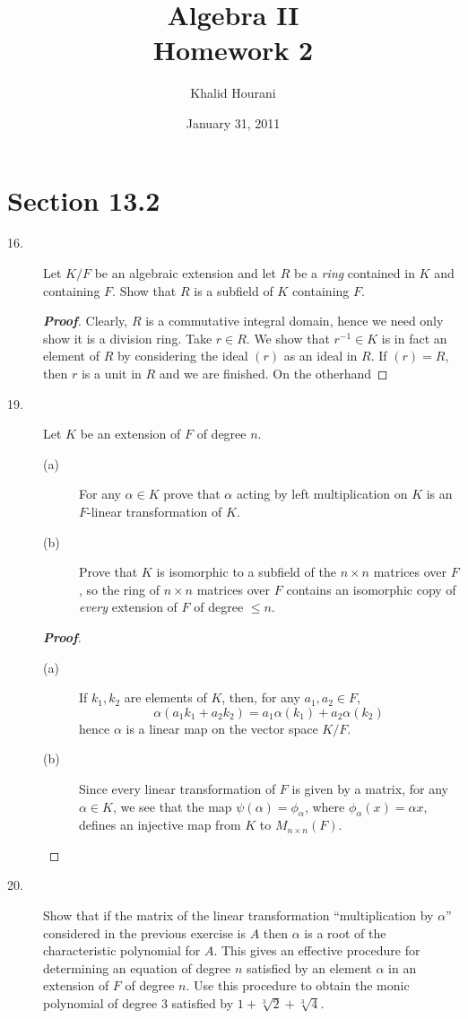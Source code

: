 \documentclass[12pt,leqno]{book}
\title{Algebra II\\\large Homework 2}
\date{January 31, 2011}
\author{Khalid Hourani}
\theoremstyle{definition}
\newenvironment{Proof}{\begin{proof}[\textnormal{\textbf{Proof}}]}{\end{proof}}
\begin{document}
 \begin{titlepage}
  \maketitle
 \end{titlepage}

\section*{Section 13.2}
  \begin{description}
   \item [16.] Let $K/F$ be an algebraic extension and let $R$ be a \textit{ring} contained in $K$ and containing $F$. Show that $R$ is a subfield of $K$ containing $F$.
  \begin{Proof}
   Clearly, $R$ is a commutative integral domain, hence we need only show it is a division ring. Take $r\in R$. We show that $r^{-1}\in K$ is in fact an element of $R$ by considering the ideal $(r)$ as an ideal in $R$. If $(r)=R$, then $r$ is a unit in $R$ and we are finished. On the otherhand
  \end{Proof}
   \item [19.] Let $K$ be an extension of $F$ of degree $n$. 
    \begin{description}
     \item [(a)] For any $\alpha\in K$ prove that $\alpha$ acting by left multiplication on $K$ is an $F$-linear transformation of $K$.
     \item [(b)] Prove that $K$ is isomorphic to a subfield of the $n\times n$ matrices over $F$, so the ring of $n\times n$ matrices over $F$ contains an isomorphic copy of \textit{every} extension of $F$ of degree $\leq n$.
    \end{description}
    \begin{Proof}\indent
     \begin{description}
      \item [(a)] If $k_1,k_2$ are elements of $K$, then, for any $a_1,a_2\in F$, \[\alpha(a_1k_1+a_2k_2)=a_1\alpha(k_1)+a_2\alpha(k_2)\] hence $\alpha$ is a linear map on the vector space $K/F$.
      \item [(b)] Since every linear transformation of $F$ is given by a matrix, for any $\alpha\in K$, we see that the map $\psi(\alpha)=\phi_{\alpha}$, where $\phi_{\alpha}(x)=\alpha x$, defines an injective map from $K$ to $M_{n\times n}(F)$.
     \end{description}
    \end{Proof}
   \item [20.] Show that if the matrix of the linear transformation ``multiplication by $\alpha$'' considered in the previous exercise is $A$ then $\alpha$ is a root of the characteristic polynomial for $A$. This gives an effective procedure for determining an equation of degree $n$ satisfied by an element $\alpha$ in an extension of $F$ of degree $n$. Use this procedure to obtain the monic polynomial of degree 3 satisfied by $1+\sqrt[3]{2}+\sqrt[3]{4}$.
  \end{description}
\end{document}
